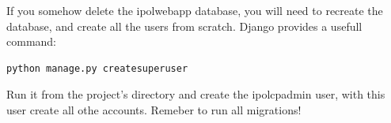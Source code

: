 If you somehow delete the ipolwebapp database, you will need to recreate the database, and create all the users from scratch. Django provides a usefull command: 

\begin{lstlisting}[language=Python,firstnumber=1]
python manage.py createsuperuser
\end{lstlisting}

Run it from the project's directory and create the ipolcpadmin user, 
with this user create all othe accounts.
Remeber to run all migrations!





